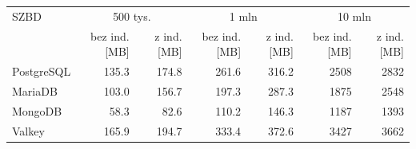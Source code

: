 \begin{tabular}{lrrrrrr}
\toprule
SZBD & \multicolumn{2}{c}{500 tys.} & \multicolumn{2}{c}{1 mln} & \multicolumn{2}{c}{10 mln} \\
& bez ind. [MB] & z ind. [MB] & bez ind. [MB] & z ind. [MB] & bez ind. [MB] & z ind. [MB] \\
\midrule
PostgreSQL & \num{135.3} & \num{174.8} & \num{261.6} & \num{316.2} & \num{2508} & \num{2832} \\
MariaDB & \num{103.0} & \num{156.7} & \num{197.3} & \num{287.3} & \num{1875} & \num{2548} \\
MongoDB & \num{58.3} & \num{82.6} & \num{110.2} & \num{146.3} & \num{1187} & \num{1393} \\
Valkey & \num{165.9} & \num{194.7} & \num{333.4} & \num{372.6} & \num{3427} & \num{3662} \\
\bottomrule
\end{tabular}
